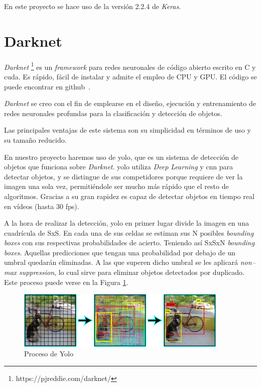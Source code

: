 En este proyecto se hace uso de la versión 2.2.4 de \textit{Keras}.


\section{Darknet}

\textit{Darknet} \footnote{https://pjreddie.com/darknet/} es un \textit{framework} para redes neuronales de código abierto escrito en C y \acrshort{cuda}. Es rápido, fácil de instalar y admite el empleo de CPU y GPU. El código se puede encontrar en github~\cite{darknet_github}.

\textit{Darknet} se creo con el fin de emplearse en el diseño, ejecución y entrenamiento de redes neuronales profundas para la clasificación y detección de objetos. 

Las principales ventajas de este sistema son su simplicidad en términos de uso y su tama\~{n}o reducido.

En nuestro proyecto haremos uso de \acrfull{yolo}, que es un sistema de detección de objetos que funciona sobre \textit{Darknet}. \acrshort{yolo} utiliza \textit{Deep Learning} y \acrshort{cnn} para detectar objetos, y se distingue de sus competidores porque requiere de ver la imagen una sola vez, permitiéndole ser mucho más rápido que el resto de algoritmos. Gracias a su gran rapidez es capaz de detectar objetos en tiempo real en vídeos (hasta 30 \acrfull{fps}).

A la hora de realizar la detección, \acrshort{yolo} en primer lugar divide la imagen en una cuadrícula de SxS. En cada una de sus celdas se estiman sus N posibles \textit{bounding boxes}  con sus respectivas probabilidades de acierto. Teniendo así SxSxN \textit{bounding boxes}. Aquellas predicciones que tengan una probabilidad por debajo de un umbral quedarán eliminadas. A las que superen dicho umbral se les aplicará \textit{non--max suppression}, lo cual sirve para eliminar objetos detectados por duplicado. Este proceso puede verse en la  Figura \ref{fig.yolo}.

\begin{figure}[H]
  \begin{center}
    \includegraphics[width=0.9\textwidth]{figures/Herramientas/yolo.png}
		\caption{Proceso de Yolo}
		\label{fig.yolo}
		\end{center}
\end{figure}

